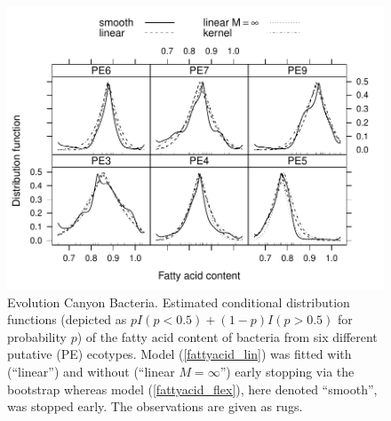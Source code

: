 



\begin{figure}[t]
\includegraphics{figures/fig-fattyacid-plot}
\caption{Evolution Canyon Bacteria. Estimated conditional distribution functions
         (depicted as $pI(p < 0.5) + (1-p)I(p > 0.5)$ for probability $p$)
         of the fatty acid content of bacteria from six different putative (PE)
         ecotypes. Model (\ref{fattyacid_lin}) was fitted
         with (``linear'') and without (``linear $M = \infty$'') early stopping via the bootstrap
         whereas model (\ref{fattyacid_flex}), here denoted ``smooth'', 
         was stopped early. The observations are given as rugs. \label{fattyacid-plot}}
\end{figure}
